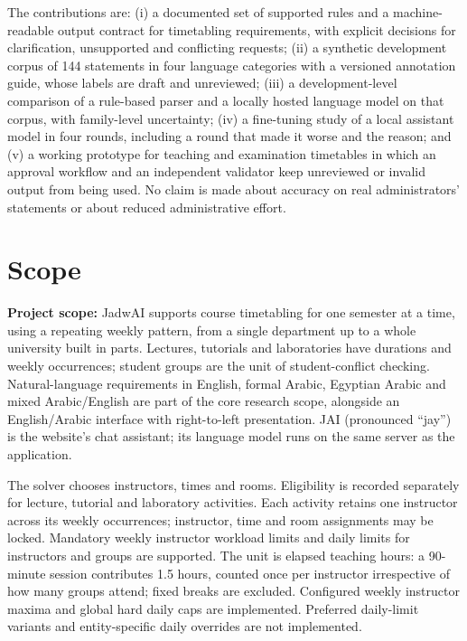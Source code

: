 The contributions are: (i) a documented set of supported rules and a
machine-readable output contract for timetabling requirements, with
explicit decisions for clarification, unsupported and conflicting
requests; (ii) a synthetic development corpus of 144 statements in four
language categories with a versioned annotation guide, whose labels are
draft and unreviewed; (iii) a development-level comparison of a
rule-based parser and a locally hosted language model on that corpus,
with family-level uncertainty; (iv) a fine-tuning study of a local
assistant model in four rounds, including a round that made it worse
and the reason; and (v) a working prototype for teaching and examination
timetables in which an approval workflow and an independent validator
keep unreviewed or invalid output from being used. No claim is made
about accuracy on real administrators' statements or about reduced
administrative effort.

\hypertarget{scope}{%
\section{Scope}\label{scope}}

\textbf{Project scope:} JadwAI supports course timetabling for one semester at a time, using a repeating weekly pattern, from a single department up to a whole university built in parts. Lectures, tutorials and laboratories have durations and weekly occurrences; student groups are the unit of student-conflict checking. Natural-language requirements in English, formal Arabic, Egyptian Arabic and mixed Arabic/English are part of the core research scope, alongside an English/Arabic interface with right-to-left presentation. JAI (pronounced ``jay'') is the website's chat assistant; its language model runs on the same server as the application.

The solver chooses instructors, times and rooms. Eligibility is recorded separately for lecture, tutorial and laboratory activities. Each activity retains one instructor across its weekly occurrences; instructor, time and room assignments may be locked. Mandatory weekly instructor workload limits and daily limits for instructors and groups are supported. The unit is elapsed teaching hours: a 90-minute session contributes 1.5 hours, counted once per instructor irrespective of how many groups attend; fixed breaks are excluded. Configured weekly instructor maxima and global hard daily caps are implemented. Preferred daily-limit variants and entity-specific daily overrides are not implemented.

